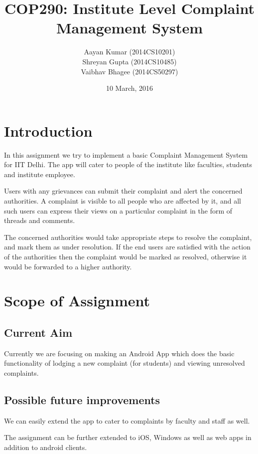 \documentclass{article}
\title{COP290: Institute Level Complaint Management
System}
\author{Aayan Kumar (2014CS10201) \\ Shreyan Gupta (2014CS10485) \\ Vaibhav Bhagee (2014CS50297) }
\date{10 March, 2016}
\begin{document}
\maketitle
 
\tableofcontents
\newpage
\section{Introduction}
    \par
    In this assignment we try to implement a basic Complaint Management System for IIT Delhi.  
    The app will cater to people of the institute like faculties, students and institute employee. 
    \par 
    Users with any grievances can submit their complaint and alert the concerned authorities.  A complaint is visible to all people who are affected by it, and all such users can express their views on a particular complaint in the form of threads and comments.
    \par
    The concerned authorities would take appropriate steps to resolve the complaint, and mark them as under resolution. If the end users are satisfied with the action of the authorities then the complaint would be marked as resolved, otherwise it would be forwarded to a higher authority.

\section{Scope of Assignment}
    \begin{addmargin}[1em]{2em}
    \subsection{Current Aim}
        Currently we are focusing on making an Android App which does the basic functionality of lodging a new complaint (for students) and viewing unresolved complaints.
    \end{addmargin}
    \begin{addmargin}[1em]{2em}
    \subsection{Possible future improvements}
        \par
        We can easily extend the app to cater to complaints by faculty and staff as well. 
        \par
        The assignment can be further extended to iOS, Windows as well as web apps in addition to android clients. 
    \end{addmargin}
    
\end{document}
